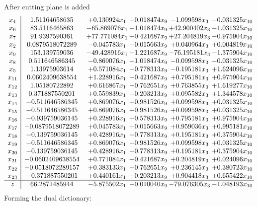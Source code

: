 \documentclass[11pt]{article}
\begin{document}
 After cutting plane is added 
\[\begin{array}{c| c c@{\hskip 2pt} c@{\hskip 2pt} c@{\hskip 2pt} c@{\hskip 2pt} }
 x_{4}   &  1.51164658635 & + 0.130924 x_{1} & + 0.018474 x_{9} & -1.099598 x_{3} & -0.031325 x_{10}\\
 x_{6}   &  83.5116465863 & -65.869076 x_{1} & + 1.018474 x_{9} & + 42.900402 x_{3} & -1.031325 x_{10}\\
 x_{7}   &  91.9397590361 & + 77.771084 x_{1} & + 0.421687 x_{9} & + 27.204819 x_{3} & -0.975904 x_{10}\\
 x_{2}   &  0.0879518072289 & -0.045783 x_{1} & -0.015663 x_{9} & + 0.040964 x_{3} & + 0.004819 x_{10}\\
 x_{9}   &  153.139759036 & -49.428916 x_{1} & + 1.221687 x_{9} & -76.195181 x_{3} & -1.375904 x_{10}\\
 x_{8}   &  0.511646586345 & -0.869076 x_{1} & + 1.018474 x_{9} & -0.099598 x_{3} & -0.031325 x_{10}\\
 x_{5}   &  1.13975903614 & + 0.571084 x_{1} & -0.778313 x_{9} & -0.195181 x_{3} & + 1.624096 x_{10}\\
 x_{11}   &  0.0602409638554 & + 1.228916 x_{1} & -0.421687 x_{9} & + 0.795181 x_{3} & + 0.975904 x_{10}\\
 x_{12}   &  1.05180722892 & + 0.616867 x_{1} & -0.762651 x_{9} & + 0.763855 x_{3} & + 1.619277 x_{10}\\
 x_{13}   &  0.371887550201 & + 0.559839 x_{1} & -0.203213 x_{9} & + 0.095582 x_{3} & + 1.344578 x_{10}\\
 x_{14}   &  -0.511646586345 & + 0.869076 x_{1} & + 0.981526 x_{9} & + 0.099598 x_{3} & + 0.031325 x_{10}\\
 x_{15}   &  -0.511646586345 & + 0.869076 x_{1} & + 0.981526 x_{9} & + 0.099598 x_{3} & + 0.031325 x_{10}\\
 x_{16}   &  -0.939759036145 & + 0.228916 x_{1} & + 0.578313 x_{9} & + 0.795181 x_{3} & + 0.975904 x_{10}\\
 x_{17}   &  -0.0879518072289 & + 0.045783 x_{1} & + 0.015663 x_{9} & + 0.959036 x_{3} & + 0.995181 x_{10}\\
 x_{18}   &  -0.139759036145 & + 0.428916 x_{1} & + 0.778313 x_{9} & + 0.195181 x_{3} & + 0.375904 x_{10}\\
 x_{19}   &  -0.511646586345 & + 0.869076 x_{1} & + 0.981526 x_{9} & + 0.099598 x_{3} & + 0.031325 x_{10}\\
 x_{20}   &  -0.139759036145 & + 0.428916 x_{1} & + 0.778313 x_{9} & + 0.195181 x_{3} & + 0.375904 x_{10}\\
 x_{21}   &  -0.0602409638554 & + 0.771084 x_{1} & + 0.421687 x_{9} & + 0.204819 x_{3} & + 0.024096 x_{10}\\
 x_{22}   &  -0.0518072289157 & + 0.383133 x_{1} & + 0.762651 x_{9} & + 0.236145 x_{3} & + 0.380723 x_{10}\\
 x_{23}   &  -0.371887550201 & + 0.440161 x_{1} & + 0.203213 x_{9} & + 0.904418 x_{3} & + 0.655422 x_{10}\\
\hline
z    &  66.2871485944 & -5.875502 x_{1} & -0.010040 x_{9} & -79.076305 x_{3} & -1.048193 x_{10}\\
\end{array}\]
Forming the dual dictionary:
\end{document}
